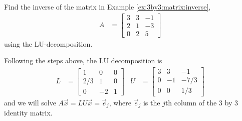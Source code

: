 \begin{example}
Find the inverse of the matrix in Example \ref{ex:3by3:matrix:inverse},
\begin{align*}
A & = \begin{bmatrix}
3 & 3 &  -1 \\ 2 &  1 &  -3 \\ 0 &  2 &  5
\end{bmatrix}
\end{align*}
using the LU-decomposition.

\solution

Following the steps above, the LU decomposition is
\begin{align*}
L & = \begin{bmatrix}
1 & 0 & 0 \\ 2/3 & 1 & 0 \\
0 & -2 & 1
\end{bmatrix} & U & = \begin{bmatrix}
3 & 3 & -1 \\
0 & -1 & -7/3 \\
0 & 0 & 1/3
\end{bmatrix}
\end{align*}
and we will solve $A\vec{x}=LU\vec{x}=\vec{e}_j$, where $\vec{e}_j$ is the $j$th column of the 3 by 3 identity matrix.  


\end{example}
